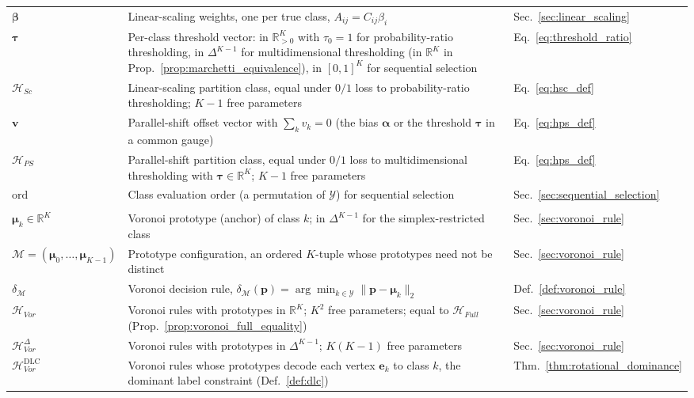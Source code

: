 {\begin{longtable}{@{}l >{\raggedright\arraybackslash}p{8cm} l@{}}
$\boldsymbol{\beta}$ & Linear-scaling weights, one per true class, $A_{ij} = C_{ij}\beta_i$ & Sec.~\ref{sec:linear_scaling} \\
$\boldsymbol{\tau}$ & Per-class threshold vector: in $\mathbb{R}^K_{>0}$ with $\tau_0 = 1$ for probability-ratio thresholding, in $\Delta^{K-1}$ for multidimensional thresholding (in $\mathbb{R}^K$ in Prop.~\ref{prop:marchetti_equivalence}), in $[0,1]^K$ for sequential selection & Eq.~\eqref{eq:threshold_ratio} \\
$\mathcal{H}_{Sc}$ & Linear-scaling partition class, equal under $0/1$ loss to probability-ratio thresholding; $K{-}1$ free parameters & Eq.~\eqref{eq:hsc_def} \\
$\mathbf{v}$ & Parallel-shift offset vector with $\sum_k v_k = 0$ (the bias $\boldsymbol{\alpha}$ or the threshold $\boldsymbol{\tau}$ in a common gauge) & Eq.~\eqref{eq:hps_def} \\
$\mathcal{H}_{PS}$ & Parallel-shift partition class, equal under $0/1$ loss to multidimensional thresholding with $\boldsymbol{\tau} \in \mathbb{R}^K$; $K{-}1$ free parameters & Eq.~\eqref{eq:hps_def} \\
$\mathrm{ord}$ & Class evaluation order (a permutation of $\mathcal{Y}$) for sequential selection & Sec.~\ref{sec:sequential_selection} \\
\addlinespace
\multicolumn{3}{@{}l}{\textit{Voronoi partitions}}\\
\midrule
$\boldsymbol{\mu}_k \in \mathbb{R}^K$ & Voronoi prototype (anchor) of class $k$; in $\Delta^{K-1}$ for the simplex-restricted class & Sec.~\ref{sec:voronoi_rule} \\
$\mathcal{M} = (\boldsymbol{\mu}_0, \ldots, \boldsymbol{\mu}_{K-1})$ & Prototype configuration, an ordered $K$-tuple whose prototypes need not be distinct & Sec.~\ref{sec:voronoi_rule} \\
$\delta_{\mathcal{M}}$ & Voronoi decision rule, $\delta_{\mathcal{M}}(\mathbf{p}) = \arg\min_{k \in \mathcal{Y}} \|\mathbf{p} - \boldsymbol{\mu}_k\|_2$ & Def.~\ref{def:voronoi_rule} \\
$\mathcal{H}_{Vor}$ & Voronoi rules with prototypes in $\mathbb{R}^K$; $K^2$ free parameters; equal to $\mathcal{H}_{Full}$ (Prop.~\ref{prop:voronoi_full_equality}) & Sec.~\ref{sec:voronoi_rule} \\
$\mathcal{H}_{Vor}^{\Delta}$ & Voronoi rules with prototypes in $\Delta^{K-1}$; $K(K{-}1)$ free parameters & Sec.~\ref{sec:voronoi_rule} \\
$\mathcal{H}_{Vor}^{\mathrm{DLC}}$ & Voronoi rules whose prototypes decode each vertex $\mathbf{e}_k$ to class $k$, the dominant label constraint (Def.~\ref{def:dlc}) & Thm.~\ref{thm:rotational_dominance} \\

\end{longtable}}
